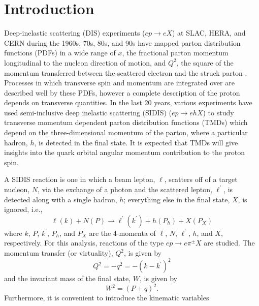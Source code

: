 \linenumbers

\chapter{Introduction}
\label{cha:Introduction}

Deep-inelastic scattering (DIS) experiments ($ep \rightarrow eX$) at SLAC, HERA, and CERN during the 1960s, 70s, 80s, and 90s have mapped parton distribution functions (PDFs) in a wide range of $x$, the fractional parton momentum longitudinal to the nucleon direction of motion, and $Q^2$, the square of the momentum transferred between the scattered electron and the struck parton \cite{NNPDF13}.
Processes in which transverse spin and momentum are integrated over are described well by these PDFs, however a complete description of the proton depends on transverse quantities.
In the last 20 years, various experiments have used semi-inclusive deep inelastic scattering (SIDIS) ($ep \rightarrow ehX$) to study transverse momentum dependent parton distribution functions (TMDs) which depend on the three-dimensional momentum of the parton, where a particular hadron, $h$, is detected in the final state.
It is expected that TMDs will give insights into the quark orbital angular momentum contribution to the proton spin.

A SIDIS reaction is one in which a beam lepton, $\ell$, scatters off of a target nucleon, $N$, via the exchange of a photon and the scattered lepton, $\ell^{\prime}$, is detected along with a single hadron, $h$; everything else in the final state, $X$, is ignored, i.e.,
\begin{equation}
\label{eq:sidis}
\ell (k) + N(P) \rightarrow \ell^{\prime} (k^{\prime} ) + h(P_{h}) + X(P_{X})
\end{equation}
where $k$, $P$, $k^{\prime}$, $P_{h}$, and $P_{X}$ are the 4-momenta of $\ell$, $N$, $\ell^{\prime}$, $h$, and $X$, respectively.
For this analysis, reactions of the type $ep \rightarrow e \pi^{\pm}X$ are studied.
The momentum transfer (or virtuality), $Q^{2}$, is given by
\begin{equation}
\label{eq:QQ}
Q^{2} = -q^{2} = -(k - k^{\prime})^{2}
\end{equation}
and the invariant mass of the final state, $W$, is given by
\begin{equation}
\label{eq:invarmassfinal}
W^2 = (P + q)^{2} .
\end{equation}
Furthermore, it is convenient to introduce the kinematic variables

